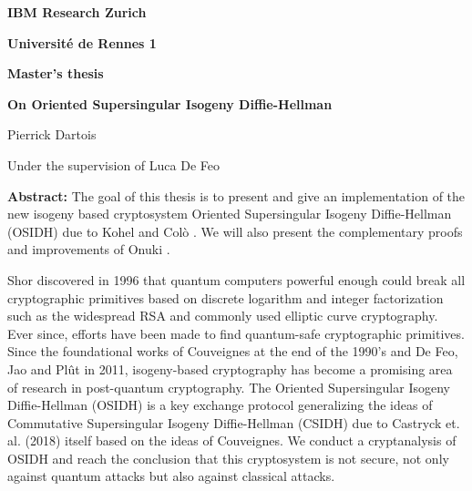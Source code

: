 \documentclass[a4paper,10pt]{report}
\theoremstyle{definition}
\theoremstyle{plain}
\theoremstyle{definition}
\renewcommand{\(}{\left(}
\renewcommand{\)}{\right)}
\begin{document}
\begin{center}

{\LARGE {\bfseries IBM Research Zurich}}

\vspace{0.2cm}

{\LARGE {\bfseries Université de Rennes 1}}

\vspace{1.5cm}

{\LARGE {\bfseries Master's thesis}}

\vspace{1.5cm}

{\huge {\bfseries On Oriented Supersingular Isogeny Diffie-Hellman}}

\vspace{1.5cm}

{\Large Pierrick Dartois}

\vspace{0.5cm}

{\Large Under the supervision of Luca De Feo}

\end{center}

\vspace{2cm}

{\bfseries Abstract:} The goal of this thesis is to present and give an implementation of the new isogeny based cryptosystem Oriented Supersingular Isogeny Diffie-Hellman (OSIDH) due to Kohel and Col\`{o} \cite{OSIDH}.  We will also present the complementary proofs and improvements of Onuki \cite{Onuki}.


Shor discovered in 1996 that quantum computers powerful enough could break all cryptographic primitives based on discrete logarithm and integer factorization such as the widespread RSA and commonly used elliptic curve cryptography.  Ever since, efforts have been made to find quantum-safe cryptographic primitives. Since the foundational works of Couveignes at the end of the 1990's and De Feo, Jao and Pl\^{u}t in 2011, isogeny-based cryptography has become a promising area of research in post-quantum cryptography.   The Oriented Supersingular Isogeny Diffie-Hellman (OSIDH) is a key exchange protocol generalizing the ideas of Commutative Supersingular Isogeny Diffie-Hellman (CSIDH) due to Castryck et. al.  (2018) itself based on the ideas of Couveignes.  We conduct a cryptanalysis of OSIDH and reach the conclusion that this cryptosystem is not secure, not only against quantum attacks but also against classical attacks.

\newpage
\end{document}
